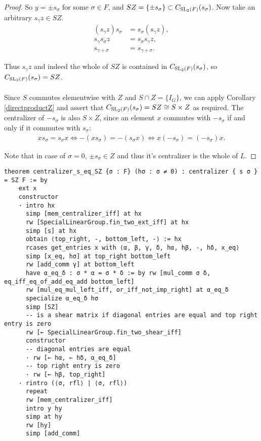\begin{proof}
So $y = \pm s_\sigma$ for some $\sigma \in F$, and $SZ = \{ \pm s_\sigma \} \subset C_{\operatorname{SL}_2(F)}(s_\sigma)$. Now take an arbitrary $s_\gamma z \in SZ$.
\begin{align*} (s_\gamma z) s_\sigma &= s_\sigma (s_\gamma z),
\\ s_\gamma s_\sigma z &= s_\sigma s_\gamma z, \tag{since $z \in Z$}
\\ s_{\gamma + \sigma} &= s_{\gamma + \sigma}.
\end{align*}

Thus $s_\gamma z$ and indeed the whole of $SZ$ is contained in $ C_{\operatorname{SL}_2(F)}(s_\sigma)$, so $C_{\operatorname{SL}_2(F)}(s_\sigma) = SZ$. \\
\\
Since $S$ commutes elementwise with $Z$ and $S \cap Z = \{ I_G \}$, we can apply Corollary \ref{directproductZ} and assert that $C_{\operatorname{SL}_2(F)}(s_\sigma) = SZ \cong S \times Z$ as required. The centralizer of $- s_\sigma$ is also $ S\times Z$, 
since an element $x$ commutes with $- s_\sigma$ if and only if it commutes with $s_\sigma$:
\begin{align*} 
    xs_\sigma = s_\sigma x \iff -(x s_\sigma) = - (s_\sigma x) \iff x(- s_\sigma) = (- s_\sigma)x.
\end{align*}

Note that in case of $\sigma = 0$, $\pm s_\sigma \in Z$ and thus it's centralizer is the whole of $L$.

\end{proof}
\begin{footnotesize}
\begin{verbatim}
theorem centralizer_s_eq_SZ {σ : F} (hσ : σ ≠ 0) : centralizer { s σ } = SZ F := by
    ext x
    constructor
    · intro hx
      simp [mem_centralizer_iff] at hx
      rw [SpecialLinearGroup.fin_two_ext_iff] at hx
      simp [s] at hx
      obtain ⟨top_right, -, bottom_left, -⟩ := hx
      rcases get_entries x with ⟨α, β, γ, δ, hα, hβ, -, hδ, x_eq⟩
      simp [x_eq, hσ] at top_right bottom_left
      rw [add_comm γ] at bottom_left
      have α_eq_δ : σ * α = σ * δ := by rw [mul_comm σ δ, eq_iff_eq_of_add_eq_add bottom_left]
      rw [mul_eq_mul_left_iff, or_iff_not_imp_right] at α_eq_δ
      specialize α_eq_δ hσ
      simp [SZ]
      -- is a shear matrix if diagonal entries are equal and top right entry is zero
      rw [← SpecialLinearGroup.fin_two_shear_iff]
      constructor
      -- diagonal entries are equal
      · rw [← hα, ← hδ, α_eq_δ]
      -- top right entry is zero
      · rw [← hβ, top_right]
    · rintro (⟨σ, rfl⟩ | ⟨σ, rfl⟩)
      repeat
      rw [mem_centralizer_iff]
      intro y hy
      simp at hy
      rw [hy]
      simp [add_comm]
\end{verbatim}
\end{footnotesize}

